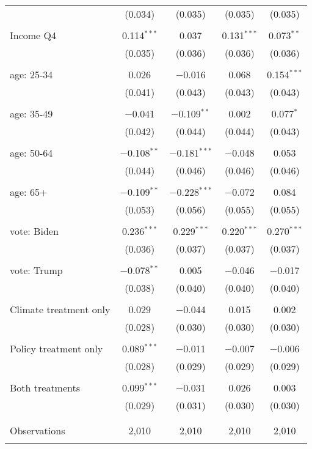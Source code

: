 \begin{tabular}{@{\extracolsep{5pt}}lcccc}
  & (0.034) & (0.035) & (0.035) & (0.035) \\ 
  & & & & \\ 
 Income Q4 & 0.114$^{***}$ & 0.037 & 0.131$^{***}$ & 0.073$^{**}$ \\ 
  & (0.035) & (0.036) & (0.036) & (0.036) \\ 
  & & & & \\ 
 age: 25-34 & 0.026 & $-$0.016 & 0.068 & 0.154$^{***}$ \\ 
  & (0.041) & (0.043) & (0.043) & (0.043) \\ 
  & & & & \\ 
 age: 35-49 & $-$0.041 & $-$0.109$^{**}$ & 0.002 & 0.077$^{*}$ \\ 
  & (0.042) & (0.044) & (0.044) & (0.043) \\ 
  & & & & \\ 
 age: 50-64 & $-$0.108$^{**}$ & $-$0.181$^{***}$ & $-$0.048 & 0.053 \\ 
  & (0.044) & (0.046) & (0.046) & (0.046) \\ 
  & & & & \\ 
 age: 65+ & $-$0.109$^{**}$ & $-$0.228$^{***}$ & $-$0.072 & 0.084 \\ 
  & (0.053) & (0.056) & (0.055) & (0.055) \\ 
  & & & & \\ 
 vote: Biden & 0.236$^{***}$ & 0.229$^{***}$ & 0.220$^{***}$ & 0.270$^{***}$ \\ 
  & (0.036) & (0.037) & (0.037) & (0.037) \\ 
  & & & & \\ 
 vote: Trump & $-$0.078$^{**}$ & 0.005 & $-$0.046 & $-$0.017 \\ 
  & (0.038) & (0.040) & (0.040) & (0.040) \\ 
  & & & & \\ 
 Climate treatment only & 0.029 & $-$0.044 & 0.015 & 0.002 \\ 
  & (0.028) & (0.030) & (0.030) & (0.030) \\ 
  & & & & \\ 
 Policy treatment only & 0.089$^{***}$ & $-$0.011 & $-$0.007 & $-$0.006 \\ 
  & (0.028) & (0.029) & (0.029) & (0.029) \\ 
  & & & & \\ 
 Both treatments & 0.099$^{***}$ & $-$0.031 & 0.026 & 0.003 \\ 
  & (0.029) & (0.031) & (0.030) & (0.030) \\ 
  & & & & \\ 
\hline \\[-1.8ex] 

Observations & 2,010 & 2,010 & 2,010 & 2,010 \\ 
\hline 
\hline \\[-1.8ex] 
\end{tabular} 